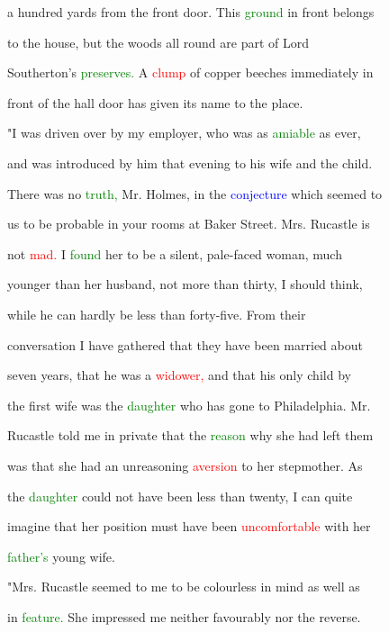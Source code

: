  a hundred yards from the front door. This \textcolor{green}{ground} in front belongs

 to the house, but the woods all round are part of \textcolor{BurntOrange}{Lord}

 Southerton's \textcolor{green}{preserves.} A \textcolor{red}{clump} of copper beeches \textcolor{BurntOrange}{immediately} in

 front of the hall door has given its name to the place.



 "I was driven over by my employer, who was as \textcolor{green}{amiable} as ever,

 and was introduced by him that evening to his wife and the \textcolor{BurntOrange}{child.}

 There was no \textcolor{green}{truth,} Mr. Holmes, in the \textcolor{blue}{conjecture} which seemed to

 us to be probable in your rooms at Baker Street. Mrs. Rucastle is

 not \textcolor{red}{mad.} I \textcolor{green}{found} her to be a silent, pale-faced woman, much

 \textcolor{BurntOrange}{younger} than her husband, not more than thirty, I should think,

 while he can hardly be less than forty-five. From their

 conversation I have gathered that they have been married about

 seven years, that he was a \textcolor{red}{widower,} and that his only \textcolor{BurntOrange}{child} by

 the first wife was the \textcolor{green}{daughter} who has gone to Philadelphia. Mr.

 Rucastle told me in private that the \textcolor{green}{reason} why she had left them

 was that she had an unreasoning \textcolor{red}{aversion} to her stepmother. As

 the \textcolor{green}{daughter} could not have been less than twenty, I can quite

 imagine that her position must have been \textcolor{red}{uncomfortable} with her

 \textcolor{green}{father's} \textcolor{BurntOrange}{young} wife.



 "Mrs. Rucastle seemed to me to be colourless in mind as well as

 in \textcolor{green}{feature.} She impressed me neither favourably nor the reverse.

